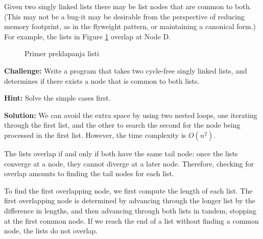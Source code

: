 \documentclass[11pt,a4paper]{article}
\begin{document}
Given two singly linked lists there may be list nodes that are common to both.
(This may not be a bug-it may be desirable from the perspective of reducing
memory footprint, as in the flyweight pattern, or maintaining a canonical
form.) For example, the lists in Figure \ref{fig:overlappinglists} overlap at 
Node D.

\begin{figure}[hb]
  \centering
  \caption{Primer preklapanja listi}
  \label{fig:overlappinglists}
\end{figure}

\textbf{Challenge:} Write a program that takes two cycle-free singly linked
lists, and determines if there exists a node that is common to both lists.

\textbf{Hint:} Solve the simple cases first.

\textbf{Solution:} We can avoid the extra space by using two nested loops, one
iterating through the first list, and the other to search the second for the
node being processed in the first list. However, the time complexity is
$O(n^2)$.

The lists overlap if and only if both have the same tail node: once the lists
converge at a node, they cannot diverge at a later node. Therefore, checking
for overlap amounts to finding the tail nodes for each list.

To find the first overlapping node, we first compute the length of each list.
The first overlapping node is determined by advancing through the longer list
by the difference in lengths, and then advancing through both lists in tandem,
stopping at the first common node. If we reach the end of a list without
finding a common node, the lists do not overlap.
\end{document}
